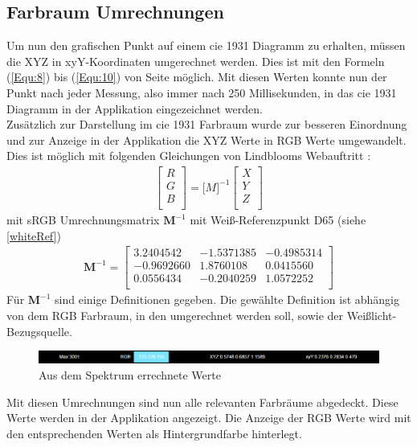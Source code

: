 \documentclass[11pt]{scrartcl}
\begin{document}
\subsection{Farbraum Umrechnungen}
Um nun den grafischen Punkt auf einem \ac{cie} 1931 Diagramm zu erhalten, müssen die XYZ in xyY-Koordinaten umgerechnet werden. Dies ist mit den
Formeln (\ref{Equ:8}) bis (\ref{Equ:10}) von Seite \pageref{Equ:10} möglich. Mit diesen Werten konnte nun der Punkt nach jeder Messung, also immer
nach 250 Millisekunden, in das \ac{cie} 1931 Diagramm in der Applikation eingezeichnet werden.\\
Zusätzlich zur Darstellung im \ac{cie} 1931 Farbraum wurde zur besseren Einordnung und zur Anzeige in der Applikation die XYZ Werte in RGB Werte
umgewandelt. Dies ist möglich mit folgenden Gleichungen von Lindblooms Webauftritt \cite{lindbloom}:\\
\begin{align}\label{Equ:12}
    \left[ \begin{array}{r}
        R \\
        G \\
        B \\
    \end{array}\right]
    = {\mathbf[M]^{-1}} \left[ \begin{array}{r}
        X \\
        Y \\
        Z \\
    \end{array}\right]
\end{align}
mit sRGB Umrechnungsmatrix $\mathbf M^{-1}$ mit Weiß-Referenzpunkt D65 (siehe \ref{whiteRef})
\begin{align}\label{Equ:13}
    \mathbf M^{-1} = \left[ \begin{array}{rrr}
        3.2404542  & -1.5371385 & -0.4985314 \\
        -0.9692660 & 1.8760108  & 0.0415560  \\
        0.0556434  & -0.2040259 & 1.0572252  \\
    \end{array}\right]
\end{align}
Für $\mathbf M^{-1}$ sind einige Definitionen gegeben. Die gewählte Definition ist abhängig von dem RGB Farbraum, in den umgerechnet werden soll, sowie
der Weißlicht-Bezugsquelle.
\begin{figure}[H]
    \begin{center}
        \includegraphics[width=\textwidth]{images/app_dummy_info_with_rgb.png}
    \end{center}
    \caption{Aus dem Spektrum errechnete Werte}
\end{figure}
\noindent
Mit diesen Umrechnungen sind nun alle relevanten Farbräume abgedeckt. Diese Werte werden in der Applikation angezeigt. Die Anzeige der RGB Werte
wird mit den entsprechenden Werten als Hintergrundfarbe hinterlegt.
\end{document}
